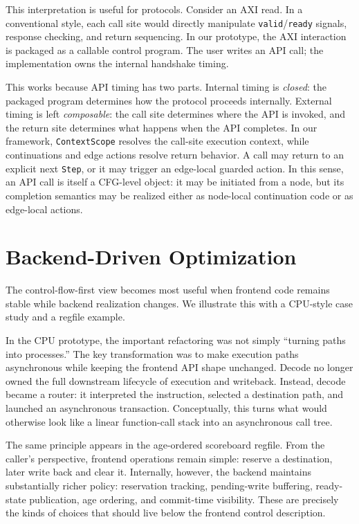\documentclass[conference]{IEEEtran}
\begin{document}
This interpretation is useful for protocols. Consider an AXI read. In a conventional style, each call site would directly manipulate \texttt{valid}/\texttt{ready} signals, response checking, and return sequencing. In our prototype, the AXI interaction is packaged as a callable control program. The user writes an API call; the implementation owns the internal handshake timing.

This works because API timing has two parts. Internal timing is \emph{closed}: the packaged program determines how the protocol proceeds internally. External timing is left \emph{composable}: the call site determines where the API is invoked, and the return site determines what happens when the API completes. In our framework, \texttt{ContextScope} resolves the call-site execution context, while continuations and edge actions resolve return behavior. A call may return to an explicit next \texttt{Step}, or it may trigger an edge-local guarded action. In this sense, an API call is itself a CFG-level object: it may be initiated from a node, but its completion semantics may be realized either as node-local continuation code or as edge-local actions.

\section{Backend-Driven Optimization}
The control-flow-first view becomes most useful when frontend code remains stable while backend realization changes. We illustrate this with a CPU-style case study and a regfile example.

In the CPU prototype, the important refactoring was not simply ``turning paths into processes.'' The key transformation was to make execution paths asynchronous while keeping the frontend API shape unchanged. Decode no longer owned the full downstream lifecycle of execution and writeback. Instead, decode became a router: it interpreted the instruction, selected a destination path, and launched an asynchronous transaction. Conceptually, this turns what would otherwise look like a linear function-call stack into an asynchronous call tree.

The same principle appears in the age-ordered scoreboard regfile. From the caller's perspective, frontend operations remain simple: reserve a destination, later write back and clear it. Internally, however, the backend maintains substantially richer policy: reservation tracking, pending-write buffering, ready-state publication, age ordering, and commit-time visibility. These are precisely the kinds of choices that should live below the frontend control description.
\end{document}
